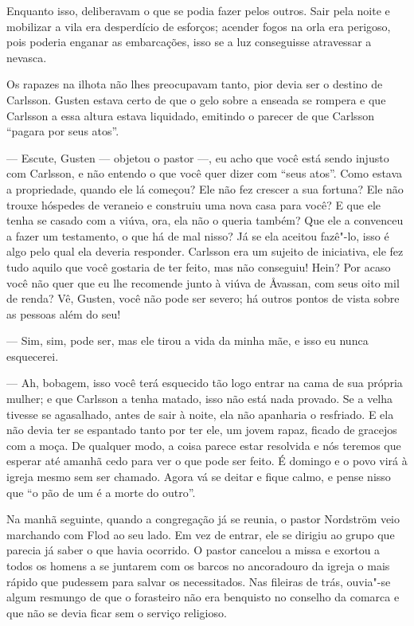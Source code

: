 Enquanto isso, deliberavam o que se podia fazer pelos outros. Sair pela noite e
mobilizar a vila era desperdício de esforços; acender fogos na orla era
perigoso, pois poderia enganar as embarcações, isso se a luz conseguisse
atravessar a nevasca.

Os rapazes na ilhota não lhes preocupavam tanto, pior devia ser o destino de
Carlsson. Gusten estava certo de que o gelo sobre a enseada se rompera e que
Carlsson a essa altura estava liquidado, emitindo o parecer de que Carlsson
``pagara por seus atos''.

--- Escute, Gusten --- objetou o pastor ---, eu acho que você está sendo injusto com
Carlsson, e não entendo o que você quer dizer com ``seus atos''. Como estava a
propriedade, quando ele lá começou? Ele não fez crescer a sua fortuna? Ele não
trouxe hóspedes de veraneio e construiu uma nova casa para você? E que ele tenha
se casado com a viúva, ora, ela não o queria também? Que ele a convenceu a
fazer um testamento, o que há de mal nisso? Já se ela aceitou fazê"-lo, isso é
algo pelo qual ela deveria responder. Carlsson era um sujeito de iniciativa, ele
fez tudo aquilo que você gostaria de ter feito, mas não conseguiu! Hein? Por
acaso você não quer que eu lhe recomende junto à viúva de Åvassan, com seus oito
mil de renda? Vê, Gusten, você não pode ser severo; há outros pontos de vista
sobre as pessoas além do seu!

--- Sim, sim, pode ser, mas ele tirou a vida da minha mãe, e isso eu nunca esquecerei.

--- Ah, bobagem, isso você terá esquecido tão logo entrar na cama de sua própria
mulher; e que Carlsson a tenha matado, isso não está nada provado. Se a velha
tivesse se agasalhado, antes de sair à noite, ela não apanharia o resfriado. E
ela não devia ter se espantado tanto por ter ele, um jovem rapaz, ficado de
gracejos com a moça. De qualquer modo, a coisa parece estar resolvida e nós
teremos que esperar até amanhã cedo para ver o que pode ser feito. É domingo e o
povo virá à igreja mesmo sem ser chamado. Agora vá se deitar e fique calmo, e
pense nisso que ``o pão de um é a morte do outro''.

\asterisc

Na manhã seguinte, quando a congregação já se reunia, o pastor Nordström veio
marchando com Flod ao seu lado. Em vez de entrar, ele se dirigiu ao grupo que
parecia já saber o que havia ocorrido. O pastor cancelou a missa e exortou a
todos os homens a se juntarem com os barcos no ancoradouro da igreja o mais
rápido que pudessem para salvar os necessitados. Nas fileiras de trás, ouvia"-se
algum resmungo de que o forasteiro não era benquisto no conselho da comarca e que
não se devia ficar sem o serviço religioso.


